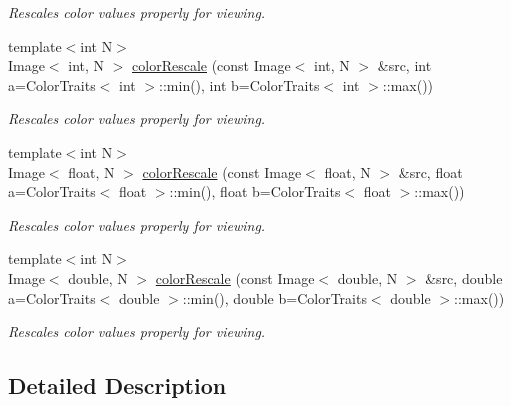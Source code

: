 \begin{DoxyCompactItemize}
\begin{DoxyCompactList}\small\item\em Rescales color values properly for viewing. \end{DoxyCompactList}\item 
\hypertarget{group___image_gac3b1da175cc8d5ec00abf01554aba92a}{{\footnotesize template$<$int N$>$ }\\Image$<$ int, N $>$ \hyperlink{group___image_gac3b1da175cc8d5ec00abf01554aba92a}{color\-Rescale} (const Image$<$ int, N $>$ \&src, int a=Color\-Traits$<$ int $>$\-::min(), int b=Color\-Traits$<$ int $>$\-::max())}\label{group___image_gac3b1da175cc8d5ec00abf01554aba92a}

\begin{DoxyCompactList}\small\item\em Rescales color values properly for viewing. \end{DoxyCompactList}\item 
\hypertarget{group___image_gae3dde5569ec14946867c7b62b3062956}{{\footnotesize template$<$int N$>$ }\\Image$<$ float, N $>$ \hyperlink{group___image_gae3dde5569ec14946867c7b62b3062956}{color\-Rescale} (const Image$<$ float, N $>$ \&src, float a=Color\-Traits$<$ float $>$\-::min(), float b=Color\-Traits$<$ float $>$\-::max())}\label{group___image_gae3dde5569ec14946867c7b62b3062956}

\begin{DoxyCompactList}\small\item\em Rescales color values properly for viewing. \end{DoxyCompactList}\item 
\hypertarget{group___image_ga0d96ddd420fb39361b01256716c2c776}{{\footnotesize template$<$int N$>$ }\\Image$<$ double, N $>$ \hyperlink{group___image_ga0d96ddd420fb39361b01256716c2c776}{color\-Rescale} (const Image$<$ double, N $>$ \&src, double a=Color\-Traits$<$ double $>$\-::min(), double b=Color\-Traits$<$ double $>$\-::max())}\label{group___image_ga0d96ddd420fb39361b01256716c2c776}

\begin{DoxyCompactList}\small\item\em Rescales color values properly for viewing. \end{DoxyCompactList}\end{DoxyCompactItemize}


\subsection{Detailed Description}


